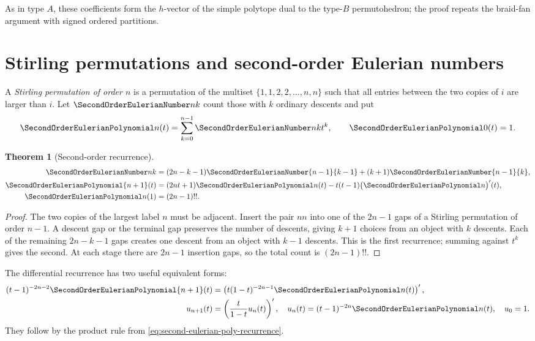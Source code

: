 \documentclass[11pt,a4paper,oneside,openany]{book}
\newtheorem{theorem}{Theorem}[chapter]
\theoremstyle{definition}
\theoremstyle{remark}
\begin{document}
As in type $A$, these coefficients form the $h$-vector of the simple polytope dual
to the type-$B$ permutohedron; the proof repeats the braid-fan argument with signed
ordered partitions.

\section{Stirling permutations and second-order Eulerian numbers}
A \emph{Stirling permutation of order $n$} is a permutation of the multiset
$\{1,1,2,2,\ldots,n,n\}$ such that all entries between the two copies of $i$ are
larger than $i$.  Let $\SecondOrderEulerianNumber nk$ count those with $k$ ordinary descents and put
\[
 \SecondOrderEulerianPolynomial n(t)=\sum_{k=0}^{n-1}\SecondOrderEulerianNumber nk t^k,
 \qquad \SecondOrderEulerianPolynomial0(t)=1.
\]

\begin{theorem}[Second-order recurrence]\label{thm:second-eulerian-recurrence}
\begin{align}
 \SecondOrderEulerianNumber nk&=(2n-k-1)\SecondOrderEulerianNumber{n-1}{k-1}
 +(k+1)\SecondOrderEulerianNumber{n-1}{k},
 \label{eq:second-eulerian-recurrence}\\
 \SecondOrderEulerianPolynomial{n+1}(t)&=(2nt+1)\SecondOrderEulerianPolynomial n(t)
 -t(t-1)\bigl(\SecondOrderEulerianPolynomial n\bigr)'(t),
 \label{eq:second-eulerian-poly-recurrence}\\
 \SecondOrderEulerianPolynomial n(1)&=(2n-1)!!.
 \label{eq:second-eulerian-row-sum}
\end{align}
\end{theorem}
\begin{proof}
The two copies of the largest label $n$ must be adjacent.  Insert the pair $nn$
into one of the $2n-1$ gaps of a Stirling permutation of order $n-1$.  A descent
gap or the terminal gap preserves the number of descents, giving $k+1$ choices
from an object with $k$ descents.  Each of the remaining $2n-k-1$ gaps creates one
descent from an object with $k-1$ descents.  This is the first recurrence; summing
against $t^k$ gives the second.  At each stage there are $2n-1$ insertion gaps, so
the total count is $(2n-1)!!$.
\end{proof}

The differential recurrence has two useful equivalent forms:
\begin{align}
 (t-1)^{-2n-2}\SecondOrderEulerianPolynomial{n+1}(t)
 &=\left(t(1-t)^{-2n-1}\SecondOrderEulerianPolynomial n(t)\right)',
 \label{eq:second-eulerian-differential-form}\\
 u_{n+1}(t)&=\left(\frac{t}{1-t}u_n(t)\right)',
 \quad u_n(t)=(t-1)^{-2n}\SecondOrderEulerianPolynomial n(t),\quad u_0=1.
 \label{eq:second-eulerian-u}
\end{align}
They follow by the product rule from
\eqref{eq:second-eulerian-poly-recurrence}.
\end{document}
